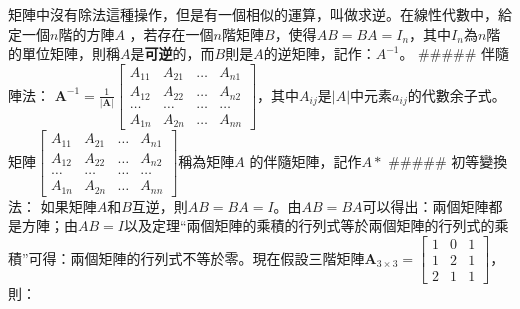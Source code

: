 \documentclass[11pt]{article}
\begin{document}
{矩陣中沒有除法這種操作，但是有一個相似的運算，叫做求逆。在線性代數中，給定一個\(n\)階的方陣\(A\)
，若存在一個\(n\)階矩陣\(B\)，使得\(AB = BA = I_n\)，其中\(I_n\)為\(n\)階的單位矩陣，則稱\(A\)是\textbf{可逆}的，而\(B\)則是\(A\)的逆矩陣，記作：\(A^{-1}\)。
\#\#\#\#\# 伴隨陣法：
\(\mathbf{A}^{-1}=\frac{1}{|\mathbf{A}|}\begin{bmatrix}A_{11} & A_{21} & \ldots & A_{n1} \\ A_{12} & A_{22} & \ldots & A_{n2} \\ \ldots & \ldots & \ldots & \ldots \\ A_{1n} & A_{2n} & \ldots & A_{nn} \end{bmatrix}\)，其中\(A_{ij}\)是\(|A|\)中元素\(a_{ij}\)的代數余子式。
矩陣\(\begin{bmatrix}A_{11} & A_{21} & \ldots & A_{n1} \\ A_{12} & A_{22} & \ldots & A_{n2} \\ \ldots & \ldots & \ldots & \ldots \\ A_{1n} & A_{2n} & \ldots & A_{nn} \end{bmatrix}\)稱為矩陣\(A\)
的伴隨矩陣，記作\(A*\) \#\#\#\#\# 初等變換法：
如果矩陣\(A\)和\(B\)互逆，則\(AB=BA=I\)。由\(AB=BA\)可以得出：兩個矩陣都是方陣；由\(AB=I\)以及定理``兩個矩陣的乘積的行列式等於兩個矩陣的行列式的乘積''可得：兩個矩陣的行列式不等於零。現在假設三階矩陣\({ \mathbf{A} }_{ 3 \times 3 }=\begin{bmatrix} 1 & 0 & 1 \\ 1 & 2 & 1 \\ 2 & 1 & 1 \end{bmatrix}\)，則：
}
\end{document}
